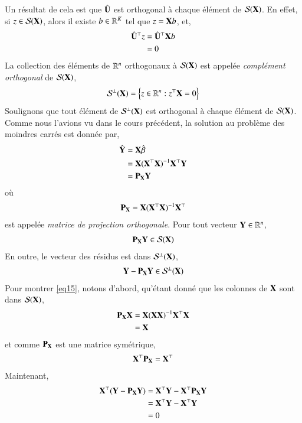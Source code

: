\documentclass[10pt, reqno]{amsart}
\begin{document}
Un  résultat de cela est que $\hat{\mathbf U}$ est orthogonal à chaque élément de $\mathcal{S}(\mathbf X)$. En effet, si $z\in \mathcal{S}(\mathbf X)$, alors il existe $b\in\mathbb{R}^K$ tel que $z=\mathbf X b$, et,
\begin{align*}
\hat{\mathbf U}^\top z &= \hat{\mathbf U}^\top\mathbf X b\\
& = 0
\end{align*}
La collection des éléments de $\mathbb{R}^n$ orthogonaux à $\mathcal{S}(\mathbf X)$ est appelée \emph{complément orthogonal} de $\mathcal{S}(\mathbf X)$,
\begin{align*}
\mathcal{S}^\perp(\mathbf X) = \left\{z \in \mathbb{R}^n: z^\top\mathbf X=0\right\}
\end{align*}
Soulignons que tout élément de $\mathcal{S}^\perp(\mathbf X)$ est orthogonal à chaque élément de $\mathcal{S}(\mathbf X)$.\\
Comme nous l'avions vu dans le cours précédent, la solution au problème des moindres carrés est donnée par,
\begin{align*}
\hat{\mathbf Y} &= \mathbf X\hat{\beta}\\
&=\mathbf X(\mathbf X^\top\mathbf X)^{-1}\mathbf X^\top\mathbf Y\\
&=\mathbf P_{\mathbf X}\mathbf Y
\end{align*}
où 
\begin{align*} \mathbf P_{\mathbf X} = \mathbf X(\mathbf X^\top\mathbf X)^{-1}\mathbf X^\top
\end{align*}
est appelée \emph{matrice de projection orthogonale}. Pour tout vecteur $\mathbf Y\in\mathbb{R}^n$,
\begin{align*}
\mathbf P_{\mathbf X}\mathbf Y \in \mathcal{S}(\mathbf X)
\end{align*}
En outre, le vecteur des résidus est dans  $\mathcal{S}^\perp(\mathbf X)$,
\begin{align}
\mathbf Y - \mathbf P_{\mathbf X}\mathbf Y \in \mathcal{S}^\perp(\mathbf X)
\label{eq15}
\end{align}
Pour montrer \eqref{eq15}, notons d'abord, qu'étant donné que les colonnes de $\mathbf X$ sont dans $\mathcal{S}(\mathbf X)$,
\begin{align*}
\mathbf P_\mathbf X\mathbf X &= \mathbf X(\mathbf X\mathbf X)^{-1}\mathbf X^\top\mathbf X\\
&=\mathbf X
\end{align*}
et comme $\mathbf P_\mathbf X$ est une matrice symétrique,
\begin{align*}
\mathbf X^\top\mathbf P_\mathbf X = \mathbf X^\top
\end{align*}
Maintenant,
\begin{align*}
\mathbf X^\top(\mathbf Y - \mathbf P_\mathbf X\mathbf Y) &= \mathbf X^\top\mathbf Y-\mathbf X^\top\mathbf P_\mathbf X\mathbf Y\\
& = \mathbf X^\top\mathbf Y-\mathbf X^\top\mathbf Y\\
&=0 
\end{align*}
\end{document}

